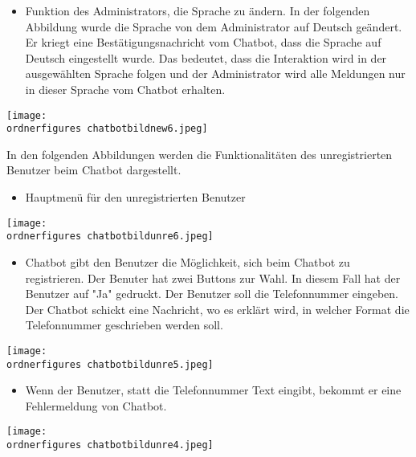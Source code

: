 \begin{itemize}
	\item Funktion des Administrators, die Sprache zu \"andern. In der folgenden Abbildung wurde die Sprache von dem Administrator auf Deutsch ge\"andert. Er kriegt eine Best\"atigungsnachricht vom Chatbot, dass die Sprache auf Deutsch eingestellt wurde. Das bedeutet, dass die Interaktion wird in der ausgew\"ahlten Sprache folgen und der Administrator wird alle Meldungen nur in dieser Sprache vom Chatbot erhalten.
\end{itemize}
\begin{center}
	\captionsetup{type=figure}
	\texttt{[image: \\ordnerfigures chatbotbildnew6.jpeg]}
	\caption{Spracheinstellungen}
	\label{fig:sprachek} 
	\captionsetup{type=figure} 
\end{center}
In den folgenden Abbildungen werden die Funktionalitäten des unregistrierten Benutzer beim Chatbot dargestellt.
\begin{itemize}
	\item Hauptmen\"u f\"ur den unregistrierten Benutzer
\end{itemize}
\begin{center}
	\captionsetup{type=figure}
	\texttt{[image: \\ordnerfigures chatbotbildunre6.jpeg]}
	\caption{Hauptmen\"u f\"ur den unregistrierten Benutzer}
	\label{fig:chaftboregistr}
\end{center}
\begin{itemize}
	\item Chatbot gibt den Benutzer die Möglichkeit, sich beim Chatbot zu registrieren. Der Benuter hat zwei Buttons zur Wahl. In diesem Fall hat der Benutzer auf "Ja" gedruckt. Der Benutzer soll die Telefonnummer eingeben. Der Chatbot schickt eine Nachricht, wo es erkl\"art wird, in welcher Format die Telefonnummer geschrieben werden soll.
\end{itemize}
\begin{center}
	\captionsetup{type=figure}
	\texttt{[image: \\ordnerfigures chatbotbildunre5.jpeg]}
	\caption{Registrierung beim Chatbot}
	\label{fig:chfdsatboregistr}
\end{center}
\begin{itemize}
	\item Wenn der Benutzer, statt die Telefonnummer Text eingibt, bekommt er eine Fehlermeldung von Chatbot.
\end{itemize}
\begin{center}
	\captionsetup{type=figure}
	\texttt{[image: \\ordnerfigures chatbotbildunre4.jpeg]}
	\caption{Falsche Eingabe des Telefonnummers}
	\label{fig:chfdsatboregistrfds}
\end{center}
